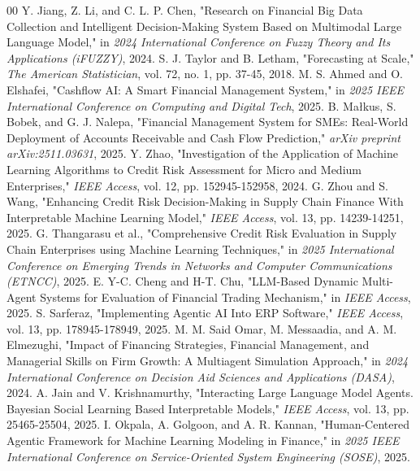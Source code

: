 \documentclass[conference]{IEEEtran}
\begin{document}
\begin{thebibliography}{00}
 Y. Jiang, Z. Li, and C. L. P. Chen, "Research on Financial Big Data Collection and Intelligent Decision-Making System Based on Multimodal Large Language Model," in \textit{2024 International Conference on Fuzzy Theory and Its Applications (iFUZZY)}, 2024.
 S. J. Taylor and B. Letham, "Forecasting at Scale," \textit{The American Statistician}, vol. 72, no. 1, pp. 37-45, 2018.
 M. S. Ahmed and O. Elshafei, "Cashflow AI: A Smart Financial Management System," in \textit{2025 IEEE International Conference on Computing and Digital Tech}, 2025.
 B. Małkus, S. Bobek, and G. J. Nalepa, "Financial Management System for SMEs: Real-World Deployment of Accounts Receivable and Cash Flow Prediction," \textit{arXiv preprint arXiv:2511.03631}, 2025.
 Y. Zhao, "Investigation of the Application of Machine Learning Algorithms to Credit Risk Assessment for Micro and Medium Enterprises," \textit{IEEE Access}, vol. 12, pp. 152945-152958, 2024.
 G. Zhou and S. Wang, "Enhancing Credit Risk Decision-Making in Supply Chain Finance With Interpretable Machine Learning Model," \textit{IEEE Access}, vol. 13, pp. 14239-14251, 2025.
 G. Thangarasu et al., "Comprehensive Credit Risk Evaluation in Supply Chain Enterprises using Machine Learning Techniques," in \textit{2025 International Conference on Emerging Trends in Networks and Computer Communications (ETNCC)}, 2025.
 E. Y-C. Cheng and H-T. Chu, "LLM-Based Dynamic Multi-Agent Systems for Evaluation of Financial Trading Mechanism," in \textit{IEEE Access}, 2025.
 S. Sarferaz, "Implementing Agentic AI Into ERP Software," \textit{IEEE Access}, vol. 13, pp. 178945-178949, 2025.
 M. M. Said Omar, M. Messaadia, and A. M. Elmezughi, "Impact of Financing Strategies, Financial Management, and Managerial Skills on Firm Growth: A Multiagent Simulation Approach," in \textit{2024 International Conference on Decision Aid Sciences and Applications (DASA)}, 2024.
 A. Jain and V. Krishnamurthy, "Interacting Large Language Model Agents. Bayesian Social Learning Based Interpretable Models," \textit{IEEE Access}, vol. 13, pp. 25465-25504, 2025.
 I. Okpala, A. Golgoon, and A. R. Kannan, "Human-Centered Agentic Framework for Machine Learning Modeling in Finance," in \textit{2025 IEEE International Conference on Service-Oriented System Engineering (SOSE)}, 2025.

\end{thebibliography}
\end{document}
